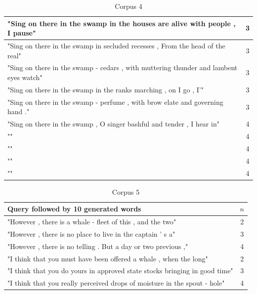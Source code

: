 \documentclass[a4paper,12pt]{article}
\begin{document}
\begin{table}
\begin{tabular}{| l |c|}
"Sing on there in the swamp in the houses are alive with people , I pause" & 3 \\ \hline
"Sing on there in the swamp in secluded recesses , From the head of the real" & 3 \\ \hline
"Sing on there in the swamp - cedars , with muttering thunder and lambent eyes watch" & 3 \\ \hline
"Sing on there in the swamp in the ranks marching , on I go , I'" & 3 \\ \hline
"Sing on there in the swamp - perfume , with brow elate and governing hand ." & 3 \\ \hline

"Sing on there in the swamp , O singer bashful and tender , I hear in" & 4 \\ \hline
"" & 4 \\ \hline
"" & 4 \\ \hline
"" & 4 \\ \hline
"" & 4 \\ \hline

\end{tabular}
\caption{ Corpus 4}
\label{tab:corpora1}
\end{table}


\begin{table}
\begin{tabular}{| l |c|}
\hline
Query followed by 10 generated words & $n$ \\ \hline
"However , there is a whale - fleet of this , and the two" & 2\\ \hline
"However , there is no place to live in the captain ' s a"& 3 \\ \hline
"However , there is no telling . But a day or two previous ," & 4 \\ \hline
"I think that you must have been offered a whale , when the long" & 2\\ \hline
"I think that you do yours in approved state stocks bringing in good time"& 3 \\ \hline
"I think that you really perceived drops of moisture in the spout - hole" & 4 \\ \hline
\end{tabular}
\caption{Corpus 5}
\label{tab:corpora1}
\end{table}
\end{document}

